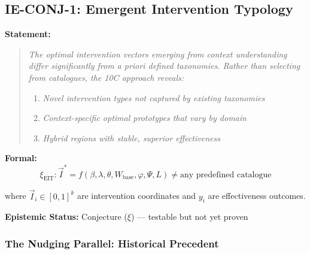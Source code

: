 \subsection{IE-CONJ-1: Emergent Intervention Typology}
\label{subsec:ie-conj-1}

\begin{tcolorbox}[colback=purple!5!white, colframe=purple!75!black,
    title=\textbf{Conjecture IE-CONJ-1: Emergent Intervention Types ($\xi$)}]

\textbf{Statement:}
\begin{quote}
\textit{The optimal intervention vectors emerging from context understanding differ significantly from a priori defined taxonomies. Rather than selecting from catalogues, the 10C approach reveals:}
\begin{enumerate}[nosep]
    \item \textit{Novel intervention types not captured by existing taxonomies}
    \item \textit{Context-specific optimal prototypes that vary by domain}
    \item \textit{Hybrid regions with stable, superior effectiveness}
\end{enumerate}
\end{quote}

\textbf{Formal:}
\begin{equation}
\boxed{\xi_{\text{EIT}}: \vec{I}^* = f(\beta, \lambda, \theta, W_{\text{base}}, \varphi, \Psi, L) \neq \text{any predefined catalogue}}
\end{equation}

where $\vec{I}_i \in [0,1]^k$ are intervention coordinates and $y_i$ are effectiveness outcomes.

\textbf{Epistemic Status:} Conjecture ($\xi$) --- testable but not yet proven

\end{tcolorbox}

\subsubsection{The Nudging Parallel: Historical Precedent}
\label{subsubsec:nudging-parallel}

